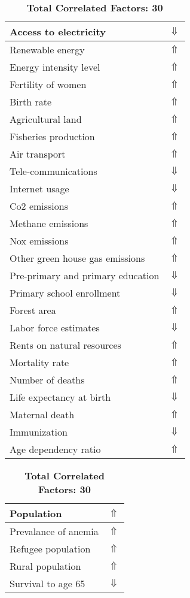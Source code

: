\documentclass[12pt,notitlepage,oneside]{report}
\begin{document}
\begin{table}[!htb]
\caption{\textbf{Shows Symptom: Jaundice $\Uparrow$}}
\centering
\label{Correlated Socio-economic Factors0}
\begin{tabular}{|l|l|}
\hline
Access to electricity & $\Downarrow$\\ \hline
Renewable energy & $\Uparrow$\\ \hline
Energy intensity level & $\Uparrow$\\ \hline
Fertility of women & $\Uparrow$\\ \hline
Birth rate & $\Uparrow$\\ \hline
Agricultural land & $\Uparrow$\\ \hline
Fisheries production & $\Uparrow$\\ \hline
Air transport  & $\Uparrow$\\ \hline
Tele-communications & $\Downarrow$\\ \hline
Internet usage & $\Downarrow$\\ \hline
Co2 emissions & $\Uparrow$\\ \hline
Methane emissions & $\Uparrow$\\ \hline
Nox emissions & $\Uparrow$\\ \hline
Other green house gas emissions & $\Uparrow$\\ \hline
Pre-primary and primary education & $\Downarrow$\\ \hline
Primary school enrollment & $\Downarrow$\\ \hline
Forest area & $\Uparrow$\\ \hline
Labor force estimates & $\Downarrow$\\ \hline
Rents on natural resources & $\Uparrow$\\ \hline
Mortality rate & $\Uparrow$\\ \hline
Number of deaths & $\Uparrow$\\ \hline
Life expectancy at birth & $\Downarrow$\\ \hline
Maternal death & $\Uparrow$\\ \hline
Immunization & $\Downarrow$\\ \hline
Age dependency ratio & $\Uparrow$\\ \hline
\end{tabular}
\begin{tabular}{|l|l|}
\hline
Population & $\Uparrow$\\ \hline
Prevalance of anemia & $\Uparrow$\\ \hline
Refugee population & $\Uparrow$\\ \hline
Rural population & $\Uparrow$\\ \hline
Survival to age 65 & $\Downarrow$\\ \hline
\end{tabular}
\caption*{\textbf{Total Correlated Factors: 30}}
\end{table}
\end{document}
